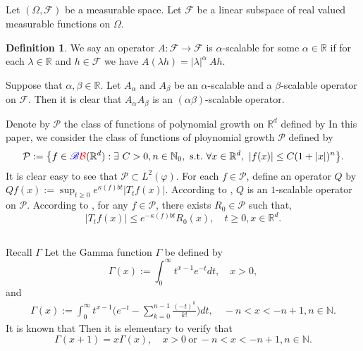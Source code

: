 \documentclass[12pt,oneside,english]{amsart}
\theoremstyle{plain}
\theoremstyle{definition}
\newtheorem{defi}[thm]{Definition}
\numberwithin{equation}{section}
\newcommand{\added}[1]{{\color{blue}#1}}\newcommand{\deleted}[1]{{\color{red}#1}}
\begin{document}
\added{
\subsection{}
    Let $(\Omega, \mathscr F)$ be a measurable space.
    Let $\mathcal F$ be a linear subspace of real valued measurable functions on $\Omega$.
\begin{defi}
\label{def: alpha-positive operator}
    We say an operator $A: \mathcal F \to \mathcal F$ is $\alpha$-scalable for some $\alpha \in \mathbb R$ if for each $\lambda \in \mathbb R$ and $h \in \mathcal F$ we have $A (\lambda h) = |\lambda|^\alpha~ Ah$.
\end{defi}

    Suppose that $\alpha, \beta \in \mathbb R$.
    Let $A_\alpha$ and $A_\beta$ be an $\alpha$-scalable and a $\beta$-scalable operator on $\mathcal F$.
    Then it is clear that $A_\alpha A_\beta$ is an $(\alpha\beta)$-scalable operator.
}
\added{
    Denote by $\mathcal P$ the class of functions of polynomial growth on $\mathbb R^d$ defined by
}
\deleted{
    In this paper, we consider the class of functions of ploynomial growth $\mathcal{P}$ defined by
}
\begin{equation}
    \mathcal{P}
    :=\big \{f\in \added{ \mathscr B}\deleted{ \mathcal{B}}(\mathbb{R}^d):\exists~ C>0, n \in \mathbb N_0, {\rm ~s.t.~} \forall x\in \mathbb{R}^d,~ |f(x)|\leq C(1+|x|)^n\big\}.
\end{equation}
    It is \added{clear} \deleted{easy to see} that $\mathcal{P} \subset L^2(\varphi)$.
    \added{ For each $f\in \mathcal {P}$, define an operator $Q$ by $Qf(x):=\sup_{t\geq 0}e^{\kappa(f)bt} |T_tf(x)|$.}
\added{
    According to \cite[Fact 1.2]{MM}, $Q$ is an $1$-scalable operator on $\mathcal P$.
}
\deleted{
    According to \cite[Fact 1.2]{MM}, for any $f \in \mathcal{P}$, there exists $R_0 \in \mathcal{P}$ such that,
\begin{equation}
\label{eq:semigroupineq}
    |T_tf(x)|
    \leq e^{-\kappa(f)bt} R_0(x),
    \quad t\geq 0, x\in \mathbb R^d.
\end{equation}
}

\subsection{}
    \added{Recall $\Gamma$} \deleted{Let} the Gamma function \deleted{$\Gamma$ be} defined by
\begin{equation}
    \Gamma (x) := \int_0^\infty t^{x-1} e^{-t}dt,
    \quad x>0,
\end{equation}
and
\begin{align}
\label{eq: definition of Gamma function}
    \Gamma(x)
    := \int_0^\infty t^{x-1} \Big(e^{-t} - \sum_{k=0}^{n-1} \frac{(-t)^k}{k!}\Big) dt,
    \quad -n< x< -n+1, n\in \mathbb N.
\end{align}
    \added{ It is known that }\deleted{ Then it is elementary to verify that}
\begin{equation}
    \Gamma(x+1) = x\Gamma(x),
    \quad x>0~\text{or}~-n< x< -n+1, n\in \mathbb N.
\end{equation}
\end{document}
